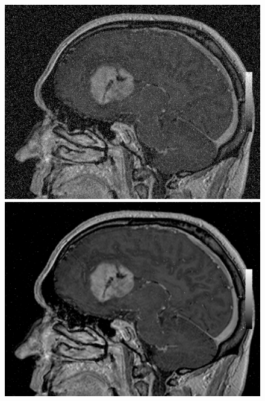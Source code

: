 \documentclass[journal]{IEEEtran}
\begin{document}
\begin{figure}[!ht]%
  \centering
  
  \includegraphics[scale=0.115]{cancer_noise.png}
  \includegraphics[scale=0.115]{cancer_noise_filtre_median.png}
  

\end{figure}
\end{document}
